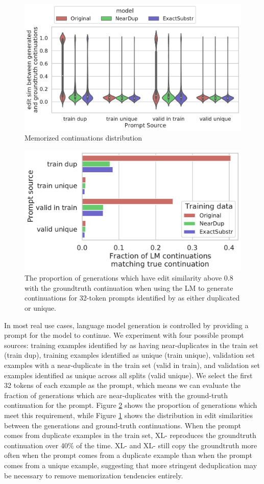 

\begin{figure}[h]
    \centering
    \includegraphics[width=0.5\linewidth]{figures/memorized_continuations_distribution.pdf}
    \caption{Memorized continuations distribution}
    \label{fig:mem-cont-dist}
\end{figure}

\begin{figure}[h]
    \centering
    \small
    \includegraphics[width=0.6\linewidth]{figures/memorized_continuations_fraction}
    \caption{The proportion of generations which have edit similarity above 0.8 with the groundtruth continuation when using the LM to generate continuations for 32-token prompts identified by \Approx{} as either duplicated or unique.}
    \label{fig:ground-truth-continuation}
\end{figure}

In most real use cases, language model generation is controlled by providing a prompt for the model to continue.
We experiment with four possible prompt sources: training examples identified by \Exact{} as having near-duplicates in the train set (train dup), training examples identified as unique (train unique), validation set examples with a near-duplicate in the train set (valid in train), and validation set examples identified as unique across all splits (valid unique).
We select the first 32 tokens of each example as the prompt, which means we can evaluate the fraction of generations which are near-duplicates with the ground-truth continuation for the prompt.
Figure \ref{fig:ground-truth-continuation} shows the proportion of generations which meet this requirement, while Figure \ref{fig:mem-cont-dist} shows the distribution in edit similarities between the generations and ground-truth continuations.
When the prompt comes from duplicate examples in the train set, XL-\Original{} reproduces the groundtruth continuation over 40\% of the time.
XL-\Exact{} and XL-\Approx{} still copy the groundtruth more often when the prompt comes from a duplicate example than when the prompt comes from a unique example, suggesting that more stringent deduplication may be necessary to remove memorization tendencies entirely. 

